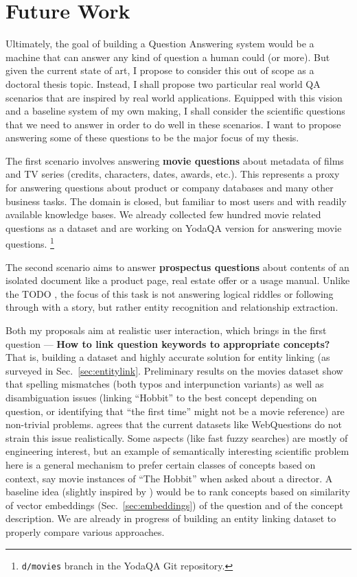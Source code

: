 \chapter{Future Work}
\label{ch:plan}

Ultimately, the goal of building a Question Answering system would
be a machine that can answer any kind of question a human could (or more).
But given the current state of art, I propose to consider this out of
scope as a doctoral thesis topic.  Instead, I shall propose two particular
real world QA scenarios that are inspired by real world applications.
Equipped with this vision and a baseline system of my own making,
I shall consider the scientific questions that we need
to answer in order to do well in these scenarios.  I want to propose
answering some of these questions to be the major focus of my thesis.

The first scenario involves answering \textbf{movie questions}
about metadata of films and TV series (credits, characters, dates,
awards, etc.).  This represents a proxy for answering questions about
product or company databases and many other business tasks.  The domain
is closed, but familiar to most users and with readily available knowledge
bases.  We already collected few hundred movie related questions as a dataset
and are working on YodaQA version for answering movie questions.%
\footnote{\texttt{d/movies} branch in the YodaQA Git repository.}

The second scenario aims to answer \textbf{prospectus questions}
about contents of an isolated document like a product page,
real estate offer or a usage manual.  Unlike the TODO \cite{MemNet},
the focus of this task is not answering logical riddles or following
through with a story, but rather entity recognition and relationship
extraction.

Both my proposals aim at realistic user interaction,
which brings in the first question ---
\textbf{How to link question keywords to appropriate concepts?}
That is, building a dataset and highly accurate solution for entity
linking (as surveyed in Sec.~\ref{sec:entitylink}.
Preliminary results on the movies dataset show that spelling mismatches
(both typos and interpunction variants) as well as disambiguation issues
(linking ``Hobbit'' to the best concept depending on question,
or identifying that ``the first time'' might not be a movie reference)
are non-trivial problems.
\cite{LeanFreebaseYao} agrees that the current
datasets like WebQuestions do not strain this issue realistically.
Some aspects (like fast fuzzy searches) are mostly of engineering interest,
but an example of semantically interesting scientific problem here
is a general mechanism to prefer certain classes of concepts based
on context, say movie instances of ``The Hobbit'' when asked about a director.
A baseline idea (slightly inspired by \cite{QuASE}) would be to rank concepts
based on similarity of vector embeddings (Sec.~\ref{sec:embeddings})
of the question and of the concept description.
We are already in progress of building an entity linking dataset to properly
compare various approaches.

